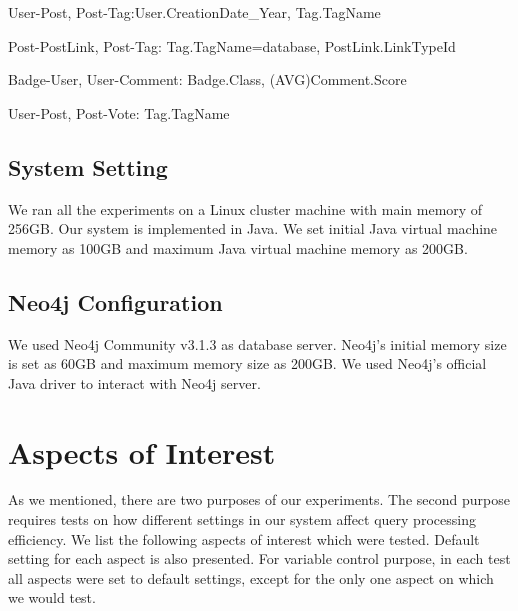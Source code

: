 User-Post, Post-Tag:User.CreationDate_Year, Tag.TagName

Post-PostLink, Post-Tag: Tag.TagName=database, PostLink.LinkTypeId

Badge-User, User-Comment: Badge.Class, (AVG)Comment.Score

User-Post, Post-Vote: Tag.TagName




\subsection{System Setting}

We ran all the experiments on a Linux cluster machine with main memory of 256GB. Our system is implemented in Java. We set initial Java virtual machine memory as 100GB and maximum Java virtual machine memory as 200GB.

\subsection{Neo4j Configuration}
We used Neo4j Community v3.1.3 as database server. Neo4j's initial memory size is set as 60GB and maximum memory size as 200GB. We used Neo4j's official Java driver to interact with Neo4j server.

\section{Aspects of Interest}
\label{Aspects of Interest}

As we mentioned, there are two purposes of our experiments. The second purpose requires tests on how different settings in our system affect query processing efficiency. We list the following aspects of interest which were tested. Default setting for each aspect is also presented. For variable control purpose, in each test all aspects were set to default settings, except for the only one aspect on which we would test.  

